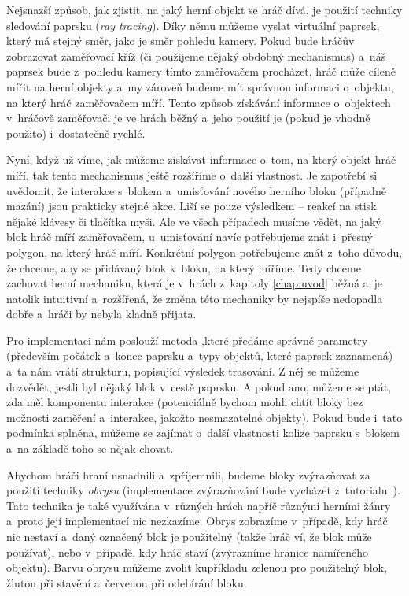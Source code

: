 Nejsnazší způsob, jak zjistit, na jaký herní objekt se hráč dívá, je použití techniky sledování paprsku (\textit{ray tracing}). Díky němu můžeme  vyslat virtuální paprsek, který má stejný směr, jako je směr pohledu kamery. Pokud bude hráčův \HUD{} zobrazovat zaměřovací kříž (či použijeme nějaký obdobný mechanismus) a~náš paprsek bude z~pohledu kamery tímto zaměřovačem procházet, hráč může cíleně mířit na herní objekty a~my zároveň budeme mít správnou informaci o~objektu, na který hráč zaměřovačem míří. Tento způsob získávání informace o~objektech v~hráčově zaměřovači je ve hrách běžný a~jeho použití je (pokud je vhodně použito) i~dostatečně rychlé.

Nyní, když už víme, jak můžeme získávat informace o~tom, na který objekt hráč míří, tak tento mechanismus ještě rozšíříme o~další vlastnost. Je zapotřebí si uvědomit, že interakce s~blokem a~umisťování nového herního bloku (případně mazání) jsou prakticky stejné akce. Liší se pouze výsledkem -- reakcí na stisk nějaké klávesy či tlačítka myši. Ale ve všech případech musíme vědět, na jaký blok hráč míří zaměřovačem, u~umisťování navíc potřebujeme znát i~přesný polygon, na který hráč míří. Konkrétní polygon potřebujeme znát z~toho důvodu, že chceme, aby se přidávaný blok  k~bloku, na který míříme. Tedy chceme zachovat herní mechaniku, která je v~hrách z~kapitoly \ref{chap:uvod} běžná a~je natolik intuitivní a~rozšířená, že změna této mechaniky by nejspíše nedopadla dobře a~hráči by nebyla kladně přijata.

Pro implementaci nám poslouží metoda ,\linebreak které předáme správné parametry (především počátek a~konec paprsku a~typy objektů, které paprsek zaznamená) a~ta nám vrátí strukturu, popisující výsledek trasování. Z něj se můžeme dozvědět, jestli byl nějaký blok v~cestě paprsku. A pokud ano, můžeme se ptát, zda měl komponentu interakce (potenciálně bychom mohli chtít bloky bez možnosti zaměření a~interakce, jakožto nesmazatelné objekty). Pokud bude i~tato podmínka splněna, můžeme se zajímat o~další vlastnosti kolize paprsku s~blokem a~na základě toho se nějak chovat.

Abychom hráči hraní usnadnili a~zpříjemnili, budeme bloky zvýrazňovat za použití techniky \textit{obrysu} (implementace zvýrazňování bude vycházet z~tutorialu~\citep{ue_outline_tut}). Tato technika je také využívána v~různých hrách napříč různými herními žánry a~proto její implementací nic nezkazíme. Obrys zobrazíme v~případě, kdy hráč nic nestaví a~daný označený blok je použitelný (takže hráč ví, že blok může používat), nebo v~případě, kdy hráč staví (zvýrazníme hranice namířeného objektu). Barvu obrysu můžeme zvolit kupříkladu zelenou pro použitelný blok, žlutou při stavění a~červenou při odebírání bloku. 


